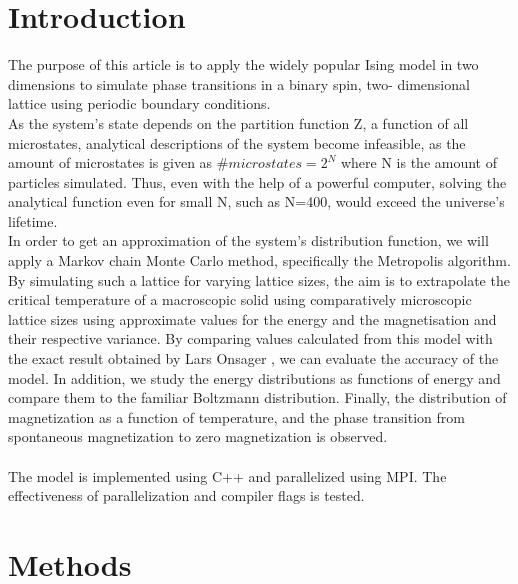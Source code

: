 \documentclass[10pt,a4paper]{article}
\begin{document}
\section{Introduction}
The purpose of this article is to apply the widely popular Ising model in two dimensions to simulate phase transitions in a binary spin, two- dimensional lattice using periodic boundary conditions. \\As the system's state depends on the partition function Z, a function of all microstates, analytical descriptions of the system become infeasible, as the amount of microstates is given as $\#microstates=2^N$ where N is the amount of particles simulated. Thus, even with the help of a powerful computer, solving the analytical function even for small N, such as N=400, would exceed the universe's lifetime.\\ In order to get an approximation of the system's distribution function, we will apply a Markov chain Monte Carlo method, specifically the Metropolis algorithm.
By simulating such a lattice for varying lattice sizes, the aim is to extrapolate the critical temperature of a macroscopic solid using comparatively microscopic lattice sizes using approximate values for the energy and the magnetisation and their respective variance. By comparing values calculated from this model with the exact result obtained by Lars Onsager \cite{onsager1944two}, we can evaluate the accuracy of the model. In addition, we study the energy distributions as functions of energy and compare them to the familiar Boltzmann distribution. Finally, the distribution of magnetization as a function of temperature, and the phase transition from spontaneous magnetization to zero magnetization is observed.\\\\The model is implemented using C++ and parallelized using MPI. The effectiveness of parallelization and compiler flags is tested.
\section{Methods}
\end{document}
